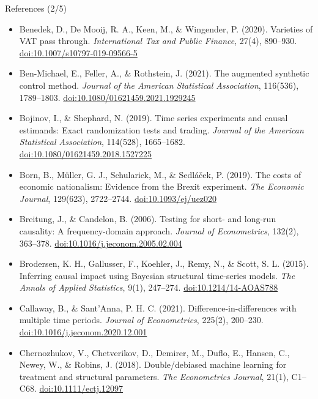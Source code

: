 \begin{frame}{References (2/5)}
\itemsize{\tiny}
\begin{itemize}
    \item Benedek, D., De Mooij, R. A., Keen, M., \& Wingender, P. (2020). Varieties of VAT pass through. \textit{International Tax and Public Finance}, 27(4), 890--930. \href{https://doi.org/10.1007/s10797-019-09566-5}{doi:10.1007/s10797-019-09566-5}
    \item Ben-Michael, E., Feller, A., \& Rothstein, J. (2021). The augmented synthetic control method. \textit{Journal of the American Statistical Association}, 116(536), 1789--1803. \href{https://doi.org/10.1080/01621459.2021.1929245}{doi:10.1080/01621459.2021.1929245}
    \item Bojinov, I., \& Shephard, N. (2019). Time series experiments and causal estimands: Exact randomization tests and trading. \textit{Journal of the American Statistical Association}, 114(528), 1665--1682. \href{https://doi.org/10.1080/01621459.2018.1527225}{doi:10.1080/01621459.2018.1527225}
    \item Born, B., Müller, G. J., Schularick, M., \& Sedláček, P. (2019). The costs of economic nationalism: Evidence from the Brexit experiment. \textit{The Economic Journal}, 129(623), 2722--2744. \href{https://doi.org/10.1093/ej/uez020}{doi:10.1093/ej/uez020}
    \item Breitung, J., \& Candelon, B. (2006). Testing for short- and long-run causality: A frequency-domain approach. \textit{Journal of Econometrics}, 132(2), 363--378. \href{https://doi.org/10.1016/j.jeconom.2005.02.004}{doi:10.1016/j.jeconom.2005.02.004}
    \item Brodersen, K. H., Gallusser, F., Koehler, J., Remy, N., \& Scott, S. L. (2015). Inferring causal impact using Bayesian structural time-series models. \textit{The Annals of Applied Statistics}, 9(1), 247--274. \href{https://doi.org/10.1214/14-AOAS788}{doi:10.1214/14-AOAS788}
    \item Callaway, B., \& Sant’Anna, P. H. C. (2021). Difference-in-differences with multiple time periods. \textit{Journal of Econometrics}, 225(2), 200--230. \href{https://doi.org/10.1016/j.jeconom.2020.12.001}{doi:10.1016/j.jeconom.2020.12.001}
    \item Chernozhukov, V., Chetverikov, D., Demirer, M., Duflo, E., Hansen, C., Newey, W., \& Robins, J. (2018). Double/debiased machine learning for treatment and structural parameters. \textit{The Econometrics Journal}, 21(1), C1--C68. \href{https://doi.org/10.1111/ectj.12097}{doi:10.1111/ectj.12097}

\end{itemize}
\end{frame}
